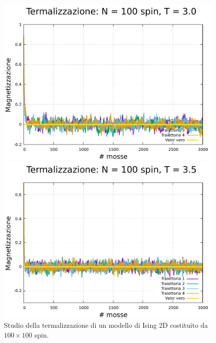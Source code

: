 \begin{figure}[htbp]
    \begin{minipage}{0.45\textwidth}  
      \centering
      \includegraphics[page=1, width=\textwidth]{Immagini/simIsing2D/metro/term/term_100_3.0.pdf}
      \caption{$T\,=\,3.0$}
    \end{minipage}\hfill
    \begin{minipage}{0.45\textwidth}  
      \centering
      \includegraphics[page=1, width=\textwidth]{Immagini/simIsing2D/metro/term/term_100_3.5.pdf}
      \caption{$T\,=\,3.5$}
    \end{minipage}
    \caption{Studio della termalizzazione di un modello di Ising 2D costituito da $100 \times 100$ spin.}
\end{figure}

